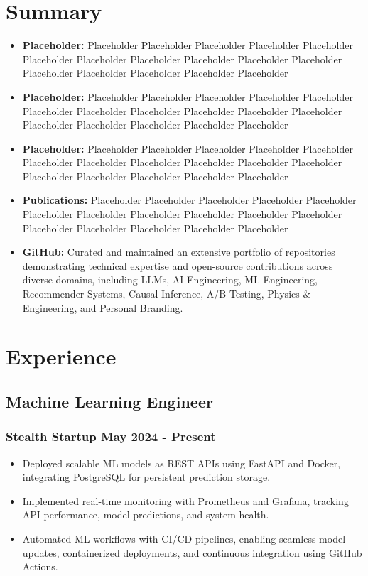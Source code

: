 \documentclass[11pt]{article}
\begin{document}
\section{Summary}
\begin{itemize}[itemsep=5pt]
	\item \textbf{Placeholder:} Placeholder Placeholder Placeholder Placeholder Placeholder Placeholder Placeholder Placeholder Placeholder Placeholder Placeholder Placeholder Placeholder Placeholder Placeholder Placeholder 
	\item \textbf{Placeholder:} Placeholder Placeholder Placeholder Placeholder Placeholder Placeholder Placeholder Placeholder Placeholder Placeholder Placeholder Placeholder Placeholder Placeholder Placeholder Placeholder 
	\item \textbf{Placeholder:} Placeholder Placeholder Placeholder Placeholder Placeholder Placeholder Placeholder Placeholder Placeholder Placeholder Placeholder Placeholder Placeholder Placeholder Placeholder Placeholder 
	\item \textbf{Publications:} Placeholder Placeholder Placeholder Placeholder Placeholder Placeholder Placeholder Placeholder Placeholder Placeholder Placeholder Placeholder Placeholder Placeholder Placeholder Placeholder   
	\item \textbf{GitHub:} Curated and maintained an extensive portfolio of repositories demonstrating technical expertise and open-source contributions across diverse domains, including LLMs, AI Engineering, ML Engineering, Recommender Systems, Causal Inference, A/B Testing, Physics \& Engineering, and Personal Branding.
\end{itemize}

\section{Experience}
\subsection{Machine Learning Engineer}
\subsubsection{Stealth Startup \hfill May 2024 - Present}
\begin{itemize}[itemsep=5pt]
	\item Deployed scalable ML models as REST APIs using FastAPI and Docker, integrating PostgreSQL for persistent prediction storage.
	\item Implemented real-time monitoring with Prometheus and Grafana, tracking API performance, model predictions, and system health. 
	\item Automated ML workflows with CI/CD pipelines, enabling seamless model updates, containerized deployments, and continuous integration using GitHub Actions.
\end{itemize}
\end{document}
